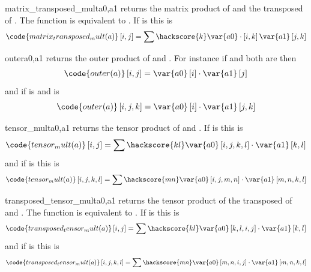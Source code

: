 \begin{funcdesc}{matrix_transposed_mult}{a0,a1}
returns the matrix product of  and the transposed of .
The function is equivalent to
.  
If  is \RankTwo this is
\begin{equation}
\code{matrix_transposed_mult(a)}\left[i,j\right]=\sum\hackscore{k}\var{a0}  \cdot \left[i,k\right]\var{a1} \left[j,k\right]
\end{equation} 
\end{funcdesc}

\begin{funcdesc}{outer}{a0,a1}
returns the outer product of  and . For instance if  and  both are \RankOne then
\begin{equation}
\code{outer(a)}\left[i,j\right]=\var{a0} \left[i\right]  \cdot  \var{a1}\left[j\right]
\end{equation} 
and if  is \RankOne and  is \RankThree
\begin{equation}
\code{outer(a)}\left[i,j,k\right]=\var{a0} \left[i\right] \cdot \var{a1}\left[j,k\right]
\end{equation} 
\end{funcdesc}

\begin{funcdesc}{tensor_mult}{a0,a1}
returns the tensor product of  and . If  is \RankTwo this is
\begin{equation}
\code{tensor_mult(a)}\left[i,j\right]=\sum\hackscore{kl}\var{a0}\left[i,j,k,l\right] \cdot \var{a1} \left[k,l\right]
\end{equation} 
and if  is \RankFour this is
\begin{equation}
\code{tensor_mult(a)}\left[i,j,k,l\right]=\sum\hackscore{mn}\var{a0} \left[i,j,m,n\right] \cdot \var{a1} \left[m,n,k,l\right]
\end{equation} 
\end{funcdesc}

\begin{funcdesc}{transposed_tensor_mult}{a0,a1}
returns the tensor product of the transposed of  and . The function is equivalent to
.
If  is \RankTwo this is
\begin{equation}
\code{transposed_tensor_mult(a)}\left[i,j\right]=\sum\hackscore{kl}\var{a0}\left[k,l,i,j\right] \cdot \var{a1} \left[k,l\right]
\end{equation} 
and if  is \RankFour this is
\begin{equation}
\code{transposed_tensor_mult(a)}\left[i,j,k,l\right]=\sum\hackscore{mn}\var{a0} \left[m,n,i,j\right] \cdot \var{a1} \left[m,n,k,l\right]
\end{equation} 
\end{funcdesc}

